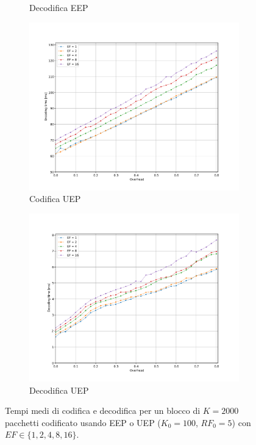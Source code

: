 \documentclass[italian, a4paper, 12pt]{article}
\begin{document}
\begin{figure}[H]
\begin{subfigure}{0.5\textwidth}
    \caption{Decodifica EEP}
    \label{fig:dectime_eep}
  \end{subfigure}
  \begin{subfigure}{0.5\textwidth}
    \centering
    \includegraphics[width=\textwidth]{plot_enc_time_uep}
    \caption{Codifica UEP}
    \label{fig:enctime_uep}
  \end{subfigure}%
  \begin{subfigure}{0.5\textwidth}
    \centering
    \includegraphics[width=\textwidth]{plot_dec_time_uep}
    \caption{Decodifica UEP}
    \label{fig:dectime_uep}
  \end{subfigure}
  \caption{Tempi medi di codifica e decodifica per un blocco di
    $K=2000$ pacchetti codificato usando EEP o UEP ($K_0 = 100$,
    $RF_0=5$) con $EF \in \{1,2,4,8,16\}$.}
  \label{fig:encdec}
\end{figure}
\end{document}
